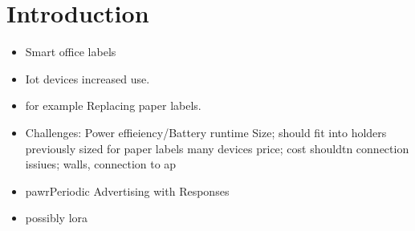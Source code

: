 \documentclass[11pt]{report}
\begin{document}
\begin{acronym}
\end{acronym}

\section*{Introduction}

\begin{itemize}
    \item Smart office labels
    \item Iot devices increased use. 
    \item for example Replacing paper labels.
    \item Challenges:
    \subitem Power effieiency/Battery runtime
    \subitem Size; should fit into holders previously sized for paper labels
    \subitem many devices
    \subsubitem price; cost shouldtn
    \subsubitem connection issiues; walls, connection to ap
    \item pawrPeriodic Advertising with Responses
    \item possibly lora
\end{itemize}
\end{document}
